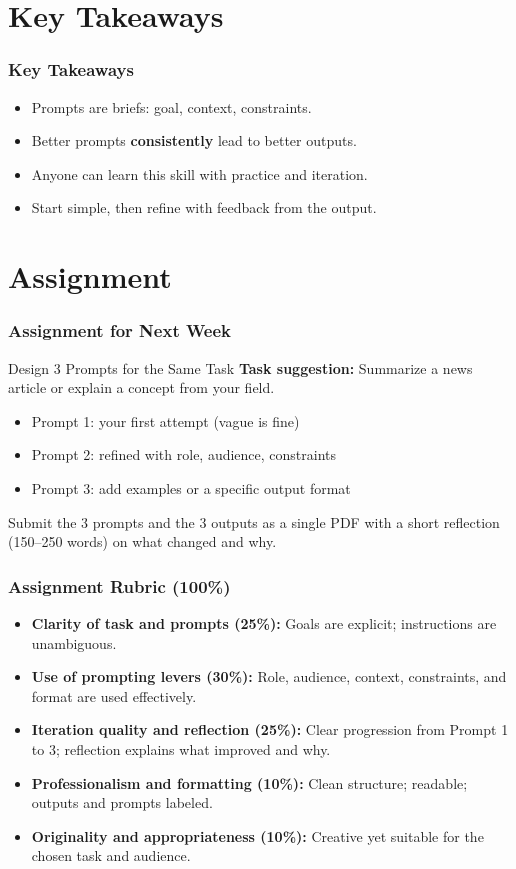 \documentclass[11pt]{beamer}
\begin{document}
\section{Key Takeaways}
\begin{frame}
  \frametitle{Key Takeaways}
  \begin{itemize}
    \item Prompts are briefs: goal, context, constraints.
    \item Better prompts \textbf{consistently} lead to better outputs.
    \item Anyone can learn this skill with practice and iteration.
    \item Start simple, then refine with feedback from the output.
  \end{itemize}
\end{frame}

\section{Assignment}
\begin{frame}
  \frametitle{Assignment for Next Week}
  \begin{block}{Design 3 Prompts for the Same Task}
    \textbf{Task suggestion:} Summarize a news article or explain a concept from your field.
    \begin{itemize}
      \item Prompt 1: your first attempt (vague is fine)
      \item Prompt 2: refined with role, audience, constraints
      \item Prompt 3: add examples or a specific output format
    \end{itemize}
    Submit the 3 prompts and the 3 outputs as a single PDF with a short reflection (150--250 words) on what changed and why.
  \end{block}
\end{frame}

\begin{frame}
  \frametitle{Assignment Rubric (100\%)}
  \begin{itemize}
    \item \textbf{Clarity of task and prompts (25\%):} Goals are explicit; instructions are unambiguous.
    \item \textbf{Use of prompting levers (30\%):} Role, audience, context, constraints, and format are used effectively.
    \item \textbf{Iteration quality and reflection (25\%):} Clear progression from Prompt 1 to 3; reflection explains what improved and why.
    \item \textbf{Professionalism and formatting (10\%):} Clean structure; readable; outputs and prompts labeled.
    \item \textbf{Originality and appropriateness (10\%):} Creative yet suitable for the chosen task and audience.
  \end{itemize}
\end{frame}
\end{document}
